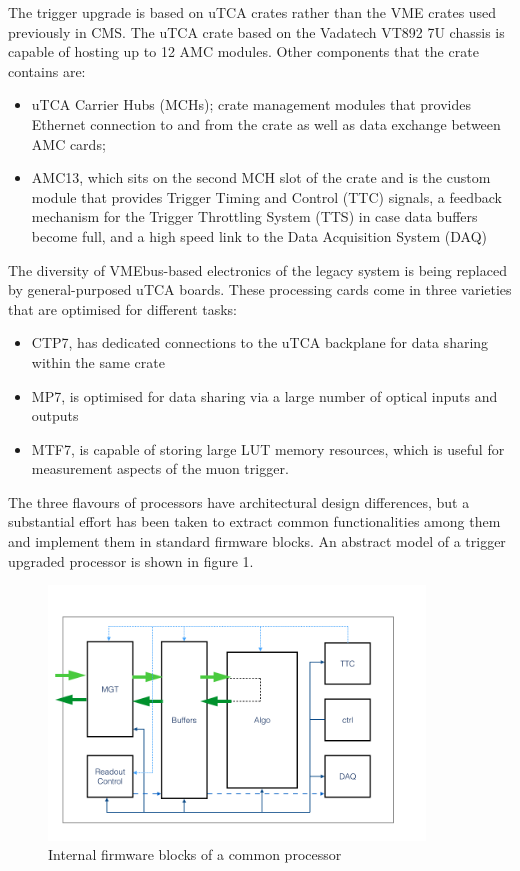 \documentclass[a4paper]{jpconf}
\begin{document}
The trigger upgrade is based on uTCA crates rather than the VME crates used previously in CMS. The uTCA crate based on the Vadatech VT892 7U chassis \cite{vadatech} is capable of hosting up to 12 AMC modules. Other components that the crate contains are:
\begin{itemize}
  \item uTCA Carrier Hubs (MCHs); crate management modules that provides Ethernet connection to and from the crate as well as data exchange between AMC cards; 
  \item AMC13, which sits on the second MCH slot of the crate and is the custom module that provides Trigger Timing and Control (TTC) signals, a feedback mechanism for the Trigger Throttling System (TTS) in case data buffers become full, and a high speed link to the Data Acquisition System (DAQ)
\end{itemize}
The diversity of VMEbus-based electronics of the legacy system is being replaced by general-purposed uTCA boards. These processing cards come in three varieties that are optimised for different tasks: 
\begin{itemize}
  \item CTP7, has dedicated connections to the uTCA backplane for data sharing within the same crate
  \item MP7, is optimised for data sharing via a large number of optical inputs and outputs
  \item MTF7, is capable of storing large LUT memory resources, which is useful for measurement aspects of the muon trigger. 
\end{itemize}
The three flavours of processors have architectural design differences, but a substantial effort has been taken to extract common functionalities among them and implement them in standard firmware blocks. An abstract model of a trigger upgraded processor is shown in figure 1. 

\begin{figure}
\begin{center}
\includegraphics[width=100mm,scale=0.5]{figures/Figure1.png}
\end{center}
\caption{\label{label} Internal firmware blocks of a common processor}
\end{figure}
\end{document}
